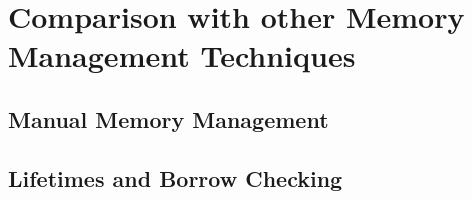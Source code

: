 \section{Comparison with other Memory Management Techniques}

\subsection{Manual Memory Management}

\subsection{Lifetimes and Borrow Checking}

